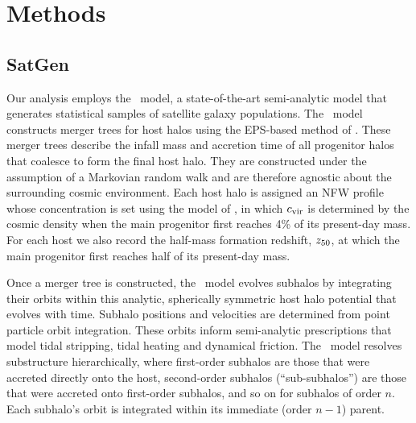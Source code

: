 \documentclass[twocolumn,apj,numberedappendix,twocolappendix,iop]{openjournal}
\begin{document}
\section{Methods}
\label{sec:methods}

\subsection{SatGen}
\label{sec:satgen}

Our analysis employs the \SatGen\ model, a state-of-the-art semi-analytic model that generates statistical samples of satellite galaxy populations. The \SatGen\ model \citep{Jiang.etal.21} constructs merger trees for host halos using the EPS-based method of \citet{Parkinson.etal.08}. These merger trees describe the infall mass and accretion time of all progenitor halos that coalesce to form the final host halo. They are constructed under the assumption of a Markovian random walk and are therefore agnostic about the surrounding cosmic environment. Each host halo is assigned an NFW profile whose concentration is set using the model of \citet{Zhao.etal.09}, in which $c_{\rm vir}$ is determined by the cosmic density when the main progenitor first reaches 4\% of its present-day mass. For each host we also record the half-mass formation redshift, $z_{50}$, at which the main progenitor first reaches half of its present-day mass.

Once a merger tree is constructed, the \SatGen\ model evolves subhalos by integrating their orbits within this analytic, spherically symmetric host halo potential that evolves with time. Subhalo positions and velocities are determined from point particle orbit integration. These orbits inform semi-analytic prescriptions \citep{vdBosch.Jiang.16, Jiang.vdBosch.17, Green.vdBosch.19} that model tidal stripping, tidal heating and dynamical friction. The \SatGen\ model resolves substructure hierarchically, where first-order subhalos are those that were accreted directly onto the host, second-order subhalos (``sub-subhalos'') are those that were accreted onto first-order subhalos, and so on for subhalos of order $n$. Each subhalo's orbit is integrated within its immediate (order $n-1$) parent. 
\end{document}

